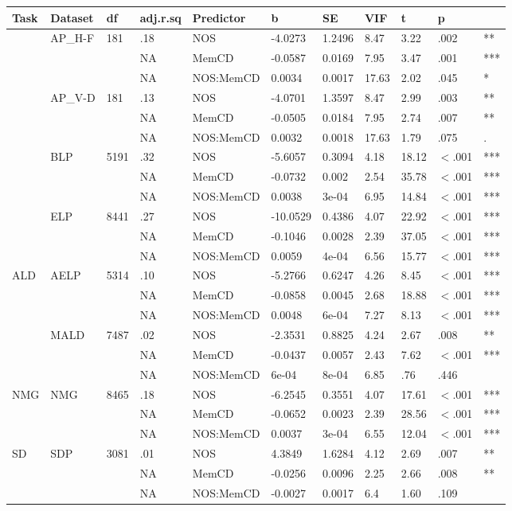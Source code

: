 \begin{table}[ht]
\centering
\begingroup\normalsize
\begin{tabular}{lllllllllll}
  \hline
Task & Dataset & df & adj.r.sq & Predictor & b & SE & VIF & t & p &  \\ 
  \hline
 & AP\_H-F & 181 & .18 & NOS & -4.0273 & 1.2496 & 8.47 & 3.22 & .002 & ** \\ 
   &  &  & NA & MemCD & -0.0587 & 0.0169 & 7.95 & 3.47 & .001 & *** \\ 
   &  &  & NA & NOS:MemCD & 0.0034 & 0.0017 & 17.63 & 2.02 & .045 & * \\ 
   & AP\_V-D & 181 & .13 & NOS & -4.0701 & 1.3597 & 8.47 & 2.99 & .003 & ** \\ 
   &  &  & NA & MemCD & -0.0505 & 0.0184 & 7.95 & 2.74 & .007 & ** \\ 
   &  &  & NA & NOS:MemCD & 0.0032 & 0.0018 & 17.63 & 1.79 & .075 & . \\ 
   & BLP & 5191 & .32 & NOS & -5.6057 & 0.3094 & 4.18 & 18.12 & $<$.001 & *** \\ 
   &  &  & NA & MemCD & -0.0732 & 0.002 & 2.54 & 35.78 & $<$.001 & *** \\ 
   &  &  & NA & NOS:MemCD & 0.0038 & 3e-04 & 6.95 & 14.84 & $<$.001 & *** \\ 
   & ELP & 8441 & .27 & NOS & -10.0529 & 0.4386 & 4.07 & 22.92 & $<$.001 & *** \\ 
   &  &  & NA & MemCD & -0.1046 & 0.0028 & 2.39 & 37.05 & $<$.001 & *** \\ 
   &  &  & NA & NOS:MemCD & 0.0059 & 4e-04 & 6.56 & 15.77 & $<$.001 & *** \\ 
  ALD & AELP & 5314 & .10 & NOS & -5.2766 & 0.6247 & 4.26 & 8.45 & $<$.001 & *** \\ 
   &  &  & NA & MemCD & -0.0858 & 0.0045 & 2.68 & 18.88 & $<$.001 & *** \\ 
   &  &  & NA & NOS:MemCD & 0.0048 & 6e-04 & 7.27 & 8.13 & $<$.001 & *** \\ 
   & MALD & 7487 & .02 & NOS & -2.3531 & 0.8825 & 4.24 & 2.67 & .008 & ** \\ 
   &  &  & NA & MemCD & -0.0437 & 0.0057 & 2.43 & 7.62 & $<$.001 & *** \\ 
   &  &  & NA & NOS:MemCD & 6e-04 & 8e-04 & 6.85 & .76 & .446 &   \\ 
  NMG & NMG & 8465 & .18 & NOS & -6.2545 & 0.3551 & 4.07 & 17.61 & $<$.001 & *** \\ 
   &  &  & NA & MemCD & -0.0652 & 0.0023 & 2.39 & 28.56 & $<$.001 & *** \\ 
   &  &  & NA & NOS:MemCD & 0.0037 & 3e-04 & 6.55 & 12.04 & $<$.001 & *** \\ 
  SD & SDP & 3081 & .01 & NOS & 4.3849 & 1.6284 & 4.12 & 2.69 & .007 & ** \\ 
   &  &  & NA & MemCD & -0.0256 & 0.0096 & 2.25 & 2.66 & .008 & ** \\ 
   &  &  & NA & NOS:MemCD & -0.0027 & 0.0017 & 6.4 & 1.60 & .109 &   \\ 
   \hline
\end{tabular}
\endgroup
\end{table}
